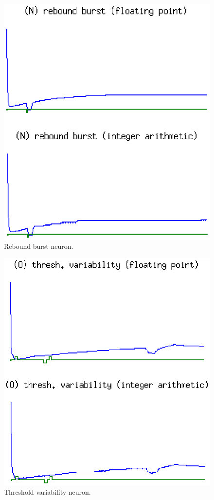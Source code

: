 \documentclass[journal]{./sty/IEEEtran}
\begin{document}
\begin{figure}
\centering
\includegraphics[scale=0.6]{imgs/izh_rebound_burst}
\caption{Rebound burst neuron.\label{fig:rebound}}
\end{figure}

\begin{figure}
\centering
\includegraphics[scale=0.6]{imgs/izh_thresh_variability}
\caption{Threshold variability neuron.\label{fig:threshvar}}
\end{figure}
\end{document}
